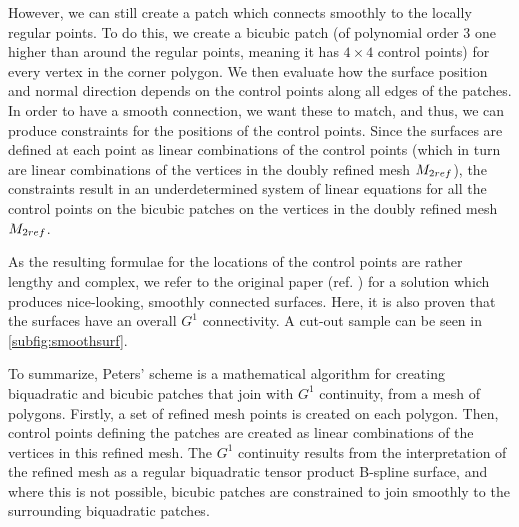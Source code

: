 However, we can still create a \Bez patch which connects smoothly to the locally regular points. To do this, we create a bicubic \Bez patch (of polynomial order 3 one higher than around the regular points, meaning it has $4\times4$ control points) for every vertex in the corner polygon.
We then evaluate how the surface position and normal direction depends on the \Bez control points along all edges of the patches. In order to have a smooth connection, we want these to match, and thus, we can produce constraints for the positions of the \Bez control points.
Since the surfaces are defined at each point as linear combinations of the \Bez control points (which in turn are linear combinations of the vertices in the doubly refined mesh $\petersControlMeshDobRef$), the constraints result in an underdetermined system of linear equations for all the \Bez control points on the bicubic \Bez patches on the vertices in the doubly refined mesh $\petersControlMeshDobRef$.

As the resulting formulae for the locations of the \Bez control points are rather lengthy and complex, we refer to the original paper (ref. \cite{peters1992constructing}) for a solution which produces nice-looking, smoothly connected surfaces. Here, it is also proven that the surfaces have an overall $G^1$ connectivity. A cut-out sample can be seen in \autoref{subfig:smoothsurf}.

To summarize, Peters' scheme is a mathematical algorithm for creating biquadratic and bicubic \Bez patches that join with $G^1$ continuity, from a mesh of polygons. Firstly, a set of refined mesh points is created on each polygon. Then, \Bez control points defining the patches are created as linear combinations of the vertices in this refined mesh. The $G^1$ continuity results from the interpretation of the refined mesh as a regular biquadratic tensor product B-spline surface, and where this is not possible, bicubic \Bez patches are constrained to join smoothly to the surrounding biquadratic patches.

